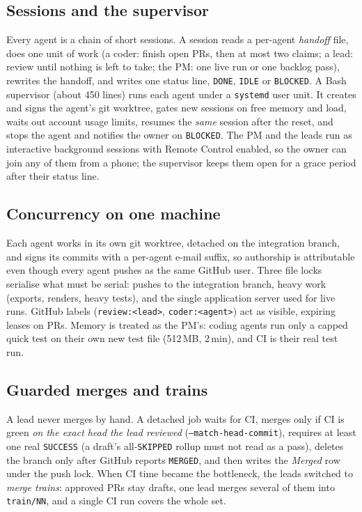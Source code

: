 \documentclass[11pt]{article}
\begin{document}
\subsection{Sessions and the supervisor}
Every agent is a chain of short sessions. A session reads a per-agent
\emph{handoff} file, does one unit of work (a coder: finish open PRs, then at
most two claims; a lead: review until nothing is left to take; the PM: one
live run or one backlog pass), rewrites the handoff, and writes one status
line, \texttt{DONE}, \texttt{IDLE} or \texttt{BLOCKED}. A Bash supervisor
(about 450 lines) runs each agent under a \texttt{systemd} user unit. It
creates and signs the agent's git worktree, gates new sessions on free memory
and load, waits out account usage limits, resumes the \emph{same} session after
the reset, and stops the agent and notifies the owner on \texttt{BLOCKED}. The
PM and the leads run as interactive background sessions with Remote Control
enabled, so the owner can join any of them from a phone; the supervisor keeps
them open for a grace period after their status line.

\subsection{Concurrency on one machine}
Each agent works in its own git worktree, detached on the integration branch,
and signs its commits with a per-agent e-mail suffix, so authorship is
attributable even though every agent pushes as the same GitHub user. Three
file locks serialise what must be serial: pushes to the integration branch,
heavy work (exports, renders, heavy tests), and the single application server
used for live runs. GitHub labels (\texttt{review:<lead>},
\texttt{coder:<agent>}) act as visible, expiring leases on PRs. Memory is
treated as the PM's: coding agents run only a capped quick test on their own
new test file (512\,MB, 2\,min), and CI is their real test run.

\subsection{Guarded merges and trains}
A lead never merges by hand. A detached job waits for CI, merges only if CI is
green \emph{on the exact head the lead reviewed}
(\texttt{--match-head-commit}), requires at least one real \texttt{SUCCESS}
(a draft's all-\texttt{SKIPPED} rollup must not read as a pass), deletes the
branch only after GitHub reports \texttt{MERGED}, and then writes the
\emph{Merged} row under the push lock. When CI time became the bottleneck, the
leads switched to \emph{merge trains}: approved PRs stay drafts, one lead
merges several of them into \texttt{train/NN}, and a single CI run covers the
whole set.
\end{document}
